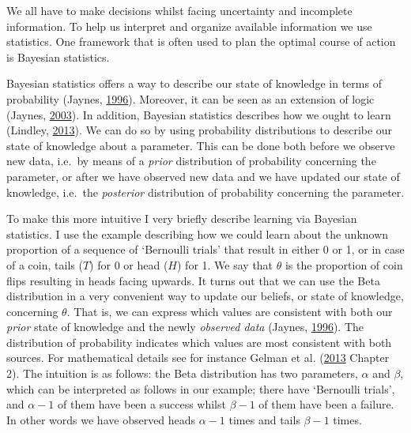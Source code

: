 \documentclass[openright,titlepage,12pt,a4paper]{book}
\begin{document}
We all have to make decisions whilst facing uncertainty and incomplete information. To help us interpret and organize available information we use statistics. One framework that is often used to plan the optimal course of action is Bayesian statistics.

Bayesian statistics offers a way to describe our state of knowledge in terms of probability (Jaynes, \protect\hyperlink{ref-jaynes_bayesian_1996}{1996}). Moreover, it can be seen as an extension of logic (Jaynes, \protect\hyperlink{ref-jaynes_probability_2003}{2003}). In addition, Bayesian statistics describes how we ought to learn (Lindley, \protect\hyperlink{ref-lindley_understanding_2013}{2013}). We can do so by using probability distributions to describe our state of knowledge about a parameter. This can be done both before we observe new data, i.e.~by means of a \emph{prior} distribution of probability concerning the parameter, or after we have observed new data and we have updated our state of knowledge, i.e.~the \emph{posterior} distribution of probability concerning the parameter.

To make this more intuitive I very briefly describe learning via Bayesian statistics. I use the example describing how we could learn about the unknown proportion of a sequence of `Bernoulli trials' that result in either 0 or 1, or in case of a coin, tails (\(T\)) for 0 or head (\(H\)) for 1. We say that \(\theta\) is the proportion of coin flips resulting in heads facing upwards. It turns out that we can use the Beta distribution in a very convenient way to update our beliefs, or state of knowledge, concerning \(\theta\). That is, we can express which values are consistent with both our \emph{prior} state of knowledge and the newly \emph{observed data} (Jaynes, \protect\hyperlink{ref-jaynes_bayesian_1996}{1996}). The distribution of probability indicates which values are most consistent with both sources. For mathematical details see for instance Gelman et al. (\protect\hyperlink{ref-gelman_bayesian_2013}{2013} Chapter 2). The intuition is as follows: the Beta distribution has two parameters, \(\alpha\) and \(\beta\), which can be interpreted as follows in our example; there have `Bernoulli trials', and \(\alpha - 1\) of them have been a success whilst \(\beta - 1\) of them have been a failure. In other words we have observed heads \(\alpha - 1\) times and tails \(\beta - 1\) times.
\end{document}
